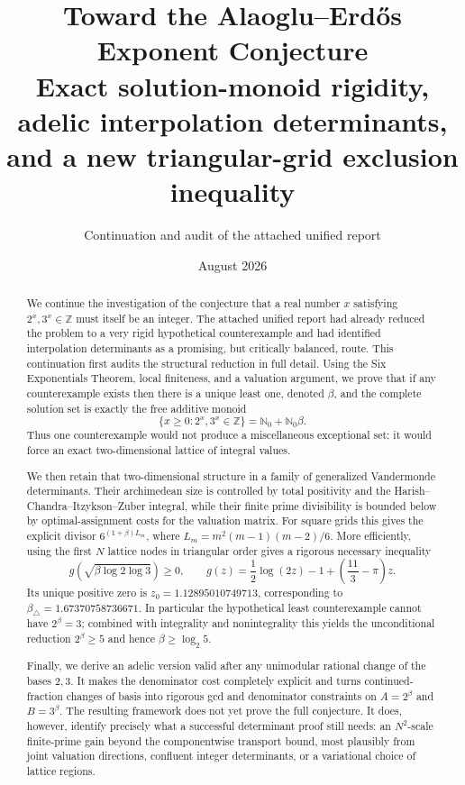 \documentclass[11pt]{article}
\title{Toward the Alaoglu--Erd\H{o}s Exponent Conjecture\\
\large Exact solution-monoid rigidity, adelic interpolation determinants,\\
and a new triangular-grid exclusion inequality}
\author{Continuation and audit of the attached unified report}
\date{August 2026}
\theoremstyle{definition}
\newcommand{\Nzero}{\mathbb N_0}
\newcommand{\Z}{\mathbb Z}
\begin{document}
\maketitle

\begin{abstract}
We continue the investigation of the conjecture that a real number $x$ satisfying
$2^x,3^x\in\Z$ must itself be an integer.  The attached unified report had
already reduced the problem to a very rigid hypothetical counterexample and
had identified interpolation determinants as a promising, but critically
balanced, route.  This continuation first audits the structural reduction in
full detail.  Using the Six Exponentials Theorem, local finiteness, and a
valuation argument, we prove that if any counterexample exists then there is a
unique least one, denoted $\beta$, and the complete solution set is exactly the
free additive monoid
\[
   \{x\ge 0:2^x,3^x\in\Z\}=\Nzero+\Nzero\beta.
\]
Thus one counterexample would not produce a miscellaneous exceptional set: it
would force an exact two-dimensional lattice of integral values.

We then retain that two-dimensional structure in a family of generalized
Vandermonde determinants.  Their archimedean size is controlled by total
positivity and the Harish--Chandra--Itzykson--Zuber integral, while their finite
prime divisibility is bounded below by optimal-assignment costs for the
valuation matrix.  For square grids this gives the explicit divisor
$6^{(1+\beta)L_m}$, where
$L_m=m^2(m-1)(m-2)/6$.  More efficiently, using the first $N$ lattice nodes in
triangular order gives a rigorous necessary inequality
\[
  g\!\left(\sqrt{\beta\log 2\log 3}\right)\ge 0,
  \qquad
  g(z)=\frac12\log(2z)-1+\left(\frac{11}{3}-\pi\right)z.
\]
Its unique positive zero is
$z_0=1.12895010749713$, corresponding to
$\beta_\triangle=1.67370758736671$.  In particular the hypothetical least
counterexample cannot have $2^\beta=3$; combined with integrality and
nonintegrality this yields the unconditional reduction $2^\beta\ge5$ and hence
$\beta\ge\log_2 5$.

Finally, we derive an adelic version valid after any unimodular rational change
of the bases $2,3$.  It makes the denominator cost completely explicit and
turns continued-fraction changes of basis into rigorous gcd and denominator
constraints on $A=2^\beta$ and $B=3^\beta$.  The resulting framework does not
yet prove the full conjecture.  It does, however, identify precisely what a
successful determinant proof still needs: an $N^2$-scale finite-prime gain
beyond the componentwise transport bound, most plausibly from joint valuation
directions, confluent integer determinants, or a variational choice of lattice
regions.



\end{abstract}
\end{document}
